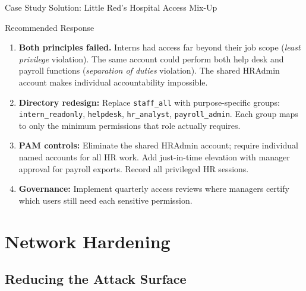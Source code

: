 \documentclass[aspectratio=169]{beamer}  %
\begin{document}
\begin{frame}{Case Study Solution: Little Red's Hospital Access Mix-Up}
    \begin{exampleblock}{Recommended Response}
        \footnotesize
        \begin{enumerate}
            \item \textbf{Both principles failed.} Interns had access far beyond their job scope (\emph{least privilege} violation). The same account could perform both help desk and payroll functions (\emph{separation of duties} violation). The shared HRAdmin account makes individual accountability impossible.
            \item \textbf{Directory redesign:} Replace \texttt{staff\_all} with purpose-specific groups: \texttt{intern\_readonly}, \texttt{helpdesk}, \texttt{hr\_analyst}, \texttt{payroll\_admin}. Each group maps to only the minimum permissions that role actually requires.
            \item \textbf{PAM controls:} Eliminate the shared HRAdmin account; require individual named accounts for all HR work. Add just-in-time elevation with manager approval for payroll exports. Record all privileged HR sessions.
            \item \textbf{Governance:} Implement quarterly access reviews where managers certify which users still need each sensitive permission.
        \end{enumerate}
    \end{exampleblock}
\end{frame}

\section{Network Hardening}
\subsection{Reducing the Attack Surface}

\end{document}
